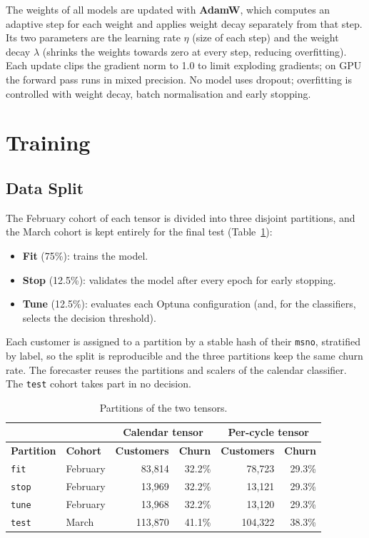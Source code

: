\documentclass{article}
\begin{document}
The weights of all models are updated with \textbf{AdamW}, which computes an adaptive step for each weight and applies weight decay separately from that step. Its two parameters are the learning rate $\eta$ (size of each step) and the weight decay $\lambda$ (shrinks the weights towards zero at every step, reducing overfitting). Each update clips the gradient norm to 1.0 to limit exploding gradients; on GPU the forward pass runs in mixed precision. No model uses dropout; overfitting is controlled with weight decay, batch normalisation and early stopping.

\section{Training}

\subsection{Data Split}

The February cohort of each tensor is divided into three disjoint partitions, and the March cohort is kept entirely for the final test (Table~\ref{tab:w2_split}):
\begin{itemize}
    \item \textbf{Fit} (75\%): trains the model.
    \item \textbf{Stop} (12.5\%): validates the model after every epoch for early stopping.
    \item \textbf{Tune} (12.5\%): evaluates each Optuna configuration (and, for the classifiers, selects the decision threshold).
\end{itemize}
Each customer is assigned to a partition by a stable hash of their \texttt{msno}, stratified by label, so the split is reproducible and the three partitions keep the same churn rate. The forecaster reuses the partitions and scalers of the calendar classifier. The \texttt{test} cohort takes part in no decision.

\begin{table}[H]
\centering
\renewcommand{\arraystretch}{1.3}
\begin{tabular}{|l|l|r|r|r|r|}
\hline
 & & \multicolumn{2}{c|}{\textbf{Calendar tensor}} & \multicolumn{2}{c|}{\textbf{Per-cycle tensor}} \\ \hline
\textbf{Partition} & \textbf{Cohort} & \textbf{Customers} & \textbf{Churn} & \textbf{Customers} & \textbf{Churn} \\ \hline
\texttt{fit}  & February & 83{,}814  & 32.2\% & 78{,}723  & 29.3\% \\ \hline
\texttt{stop} & February & 13{,}969  & 32.2\% & 13{,}121  & 29.3\% \\ \hline
\texttt{tune} & February & 13{,}968  & 32.2\% & 13{,}120  & 29.3\% \\ \hline
\texttt{test} & March    & 113{,}870 & 41.1\% & 104{,}322 & 38.3\% \\ \hline
\end{tabular}
\caption{Partitions of the two tensors.}
\label{tab:w2_split}
\end{table}
\end{document}

